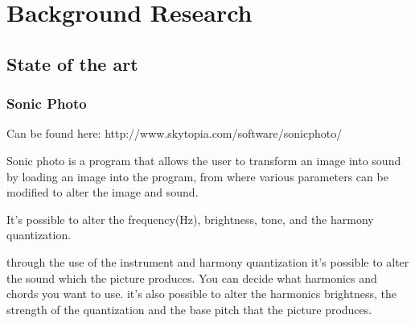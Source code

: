 \chapter{Background Research}\label{ch:bgresearch}


\section{State of the art}\label{sec:stateart}

\subsection{Sonic Photo}\label{sub:sonic}
Can be found here: http://www.skytopia.com/software/sonicphoto/

Sonic photo is a program that allows the user to transform an image into sound by loading an image into the program, from where various parameters can be modified to alter the image and sound. 

It's possible to alter the frequency(Hz), brightness, tone, and the harmony quantization. 

through the use of the instrument and harmony quantization it's possible to alter the sound which the picture produces. 
You can decide what harmonics and chords you want to use. 
it's also possible to alter the harmonics brightness, the strength of the quantization and the base pitch that the picture produces. 